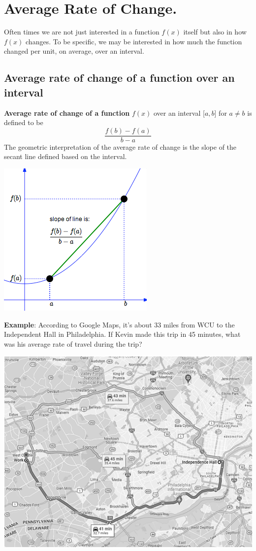 \documentclass[
]{book}
\begin{document}
\hypertarget{average-rate-of-change.}{%
\section{Average Rate of Change.}\label{average-rate-of-change.}}

Often times we are not just interested in a function \(f(x)\) itself but also in how \(f(x)\) changes. To be specific, we may be interested in how much the function changed per unit, on average, over an interval.

\hypertarget{average-rate-of-change-of-a-function-over-an-interval}{%
\subsection{Average rate of change of a function over an interval}\label{average-rate-of-change-of-a-function-over-an-interval}}

\textbf{Average rate of change of a function} \(f(x)\) over an interval {[}\(a, b\){]} for \(a \ne b\) is defined to be \[
\frac{f(b)-f(a)}{b-a}
\] The geometric interpretation of the average rate of change is the slope of the secant line defined based on the interval.

\begin{center}\includegraphics[width=0.45\linewidth]{img01/w01note16-SecantLineSlope} \end{center}

\textbf{Example}: According to Google Maps, it's about 33 miles from WCU to the Independent Hall in Philadelphia. If Kevin made this trip in 45 minutes, what was his average rate of travel during the trip?

\begin{center}\includegraphics[width=0.65\linewidth]{img01/w01note17-RateChangeDistance} \end{center}
\end{document}
